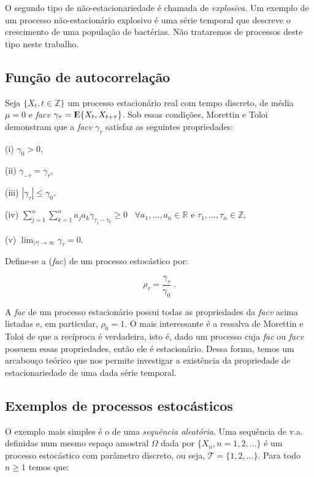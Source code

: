 O segundo tipo de não-estacionariedade é chamada de \emph{explosiva}. Um exemplo de um processo não-estacionário explosivo é uma série temporal que descreve o crescimento de uma população de bactérias. Não trataremos de processos deste tipo neste trabalho.

\subsection{Função de autocorrelação}

Seja $\{ X_t, t \in \mathbb{Z} \}$ um processo estacionário real com tempo discreto, de média $\mu = 0$ e \emph{facv} $\gamma_\tau = {\rm I\kern-.3em E}\{ X_t, X_{t+\tau} \}$. Sob essas condições, Morettin e Toloi \citep{morettin} demonstram que a \emph{facv} $\gamma_\tau$ satisfaz as seguintes propriedades:

	(i) $\gamma_0 > 0$,

	(ii) $\gamma_{-\tau} = \gamma_\tau$,

	(iii) $|\gamma_\tau| \leq \gamma_0$,

	(iv) $\sum_{j=1}^n \sum_{k=1}^n a_j a_k \gamma_{\tau_j - \tau_k} \geq 0 \;\;\; \forall a_1, \ldots, a_n \in \mathbb{R}$ e $\tau_1, \ldots, \tau_n \in \mathbb{Z}$,

	(v) $\lim_{|\tau| \to \infty}  \gamma_\tau = 0$.

Define-se a  (\emph{fac}) de um processo estocástico por:

\begin{equation}\label{series:2.14}
\rho_\tau = \frac{\gamma_\tau}{\gamma_0}\;.
\end{equation}

A \emph{fac} de um processo estacionário possui todas as propriedades da \emph{facv} acima listadas e, em particular, $\rho_0 = 1$. O mais interessante é a ressalva de Morettin e Toloi \citep{morettin} de que a recíproca é verdadeira, isto é, dado um processo cuja \emph{fac} ou \emph{facv} possuem essas propriedades, então ele é estacionário. Dessa forma, temos um arcabouço teórico que nos permite investigar a existência da propriedade de estacionariedade de uma dada série temporal.

\subsection{Exemplos de processos estocásticos}

O exemplo mais simples é o de uma \emph{sequência aleatória}. Uma sequência de v.a. definidas num mesmo espaço amostral $\Omega$ dada por $\{ X_n , n = 1, 2, \ldots \}$ é um processo estocástico com parâmetro discreto, ou seja, $\mathcal{T} = \{ 1, 2, \ldots \}$. Para todo $n \geq 1$ temos que:

